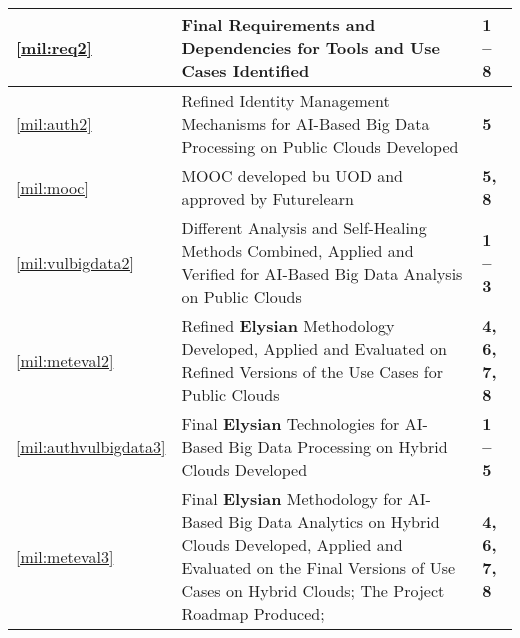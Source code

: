 \documentclass[a4paper,11pt]{article}
\newcommand{\project}[1]{\textbf{#1}\xspace}
\newcommand{\SECURITY}{\project{Elysian}}
\newcommand{\TheProject}{\SECURITY}
\begin{document}
\begin{center}
\begin{tabular*}{\textwidth}{|p{1.2cm}|p{13.3cm}|p{2.2cm}|}
\ref{mil:req2} & Final Requirements and Dependencies for Tools and Use Cases Identified & \textbf{1 -- 8} \\
  \hline
\ref{mil:auth2} & Refined Identity Management Mechanisms for AI-Based Big Data Processing on Public Clouds Developed & \textbf{5} \\
\hline
\ref{mil:mooc} & MOOC developed bu UOD and approved by Futurelearn & \textbf{5, 8} \\
\hline
\ref{mil:vulbigdata2} & Different Analysis and Self-Healing Methods Combined, Applied and Verified for AI-Based Big Data Analysis on Public Clouds & \textbf{1 -- 3} \\
\hline
\ref{mil:meteval2} & Refined \TheProject{} Methodology Developed, Applied and Evaluated on Refined Versions of the Use Cases for Public Clouds & \textbf{4, 6, 7, 8} \\
\hline
\ref{mil:authvulbigdata3} & Final \TheProject{} Technologies for AI-Based Big Data Processing on Hybrid Clouds Developed & \textbf{1 -- 5} \\
\hline
\ref{mil:meteval3} & Final \TheProject{} Methodology for AI-Based Big Data Analytics on Hybrid Clouds Developed, Applied and Evaluated on the Final Versions of Use Cases on Hybrid Clouds; The Project Roadmap Produced; & \textbf{4, 6, 7, 8} \\
\hline

  
\end{tabular*}
\end{center}
\end{document}
